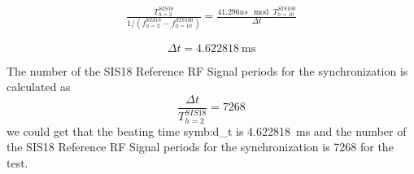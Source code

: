 \begin{equation}
\begin{aligned}
\frac{T^{SIS18}_{h=2}}{1/(f^{SIS18}_{h=2}-f^{SIS100}_{h=10})}=\frac{41.296us\mod T^{SIS100}_{h=10}}{\Delta t}
\label {syn_time}
\end{aligned}
\end{equation}

\begin{equation}
\Delta t = \SI{4.622818}{\ms}
\end{equation}

The number of the SIS18 Reference RF Signal periods for the synchronization is calculated as
\begin{equation}
\frac{\Delta t}{T^{SIS18}_{h=2}}=7268
\end{equation}
we could get that the beating time \gls{symb:d_t} is \SI{4.622818}{\ms} and the number of the SIS18 Reference RF Signal periods for the synchronization is 7268 for the test.

